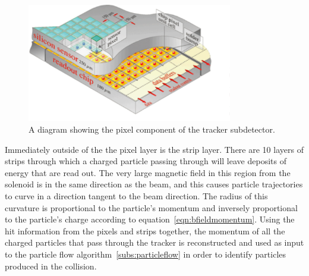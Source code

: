 \begin{figure}[!htb]
  \begin{center}
    \includegraphics[width=0.8\textwidth]{cms/figs/Pixelement.pdf}
    \caption{
      \label{fig:pixels}
      A diagram showing the pixel component of the tracker subdetector.
    }
  \end{center}
\end{figure}

Immediately outside of the the pixel layer is the strip layer.
There are 10 layers of strips through which a charged particle passing through will leave deposits of energy that are read out.
The very large magnetic field in this region from the solenoid is in the same direction as the beam,
and this causes particle trajectories to curve in a direction tangent to the beam direction. 
The radius of this curvature is proportional to the particle's momentum and inversely proportional to the particle's charge according to equation~\ref{eqn:bfieldmomentum}.
Using the hit information from the pixels and strips together,
the momentum of all the charged particles that pass through the tracker is reconstructed and used as input to the particle flow algorithm~\ref{subs:particleflow} in order to identify particles produced in the collision.


